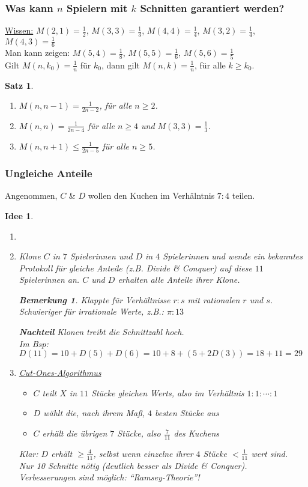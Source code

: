 \documentclass[a4paper,10pt]{scrartcl}
\newtheorem*{bemerkung*}{Bemerkung}
\newtheorem*{satz*}{Satz}
\newtheorem*{idee}{Idee}
\begin{document}
\subsubsection{Was kann $n$ Spielern mit $k$ Schnitten garantiert werden?}
\underline{Wissen:} $M(2,1)=\frac{1}{2}$, $M(3,3)=\frac{1}{3}$, $M(4,4)=\frac{1}{4}$, $M(3,2)=\frac{1}{4}$, $M(4,3)=\frac{1}{6}$\\
Man kann zeigen: $M(5,4)=\frac{1}{8}$, $M(5,5)=\frac{1}{6}$, $M(5,6)=\frac{1}{5}$\\
Gilt $M(n,k_0)=\frac{1}{n}$ für $k_0$, dann gilt $M(n,k)=\frac{1}{n}$, für alle $k\geq k_0$.
\begin{satz*}\item[]
 \begin{enumerate}
  \item $M(n,n-1)=\frac{1}{2n-2}$, für alle $n\geq2$.
  \item $M(n,n)=\frac{1}{2n-4}$ für alle $n\geq4$ und $M(3,3)=\frac{1}{3}$.
  \item $M(n,n+1)\leq\frac{1}{2n-5}$ für alle $n\geq5$.
 \end{enumerate}
\end{satz*}

\subsubsection{Ungleiche Anteile}
Angenommen, $C$ \& $D$ wollen den Kuchen im Verhälntnis $7:4$ teilen.
\begin{idee}
 \begin{enumerate}\item[]
  \item Klone $C$ in $7$ Spielerinnen und $D$ in $4$ Spielerinnen und wende ein bekanntes Protokoll für gleiche Anteile (z.B. Divide \&
        Conquer) auf diese $11$ Spielerinnen an. $C$ und $D$ erhalten alle Anteile ihrer Klone.
        \begin{bemerkung*}
         Klappte für Verhältnisse $r:s$ mit rationalen $r$ und $s$. Schwieriger für irrationale Werte, z.B.: $\pi:13$
        \end{bemerkung*}
        \textbf{Nachteil} Klonen treibt die Schnittzahl hoch.\\
        Im Bsp: $D(11)=10+D(5)+D(6)=10+8+(5+2D(3))=18+11=29$
  \item \underline{Cut-Ones-Algorithmus}
        \begin{itemize}
         \item $C$ teilt $X$ in $11$ Stücke gleichen Werts, also im Verhältnis $1:1:\cdots:1$
         \item $D$ wählt die, nach ihrem Maß, $4$ besten Stücke aus
         \item $C$ erhält die übrigen $7$ Stücke, also $\frac{7}{11}$ des Kuchens
        \end{itemize}
        Klar: $D$ erhält $\geq\frac{4}{11}$, selbst wenn einzelne ihrer $4$ Stücke $<\frac{1}{11}$ wert sind.\\
        Nur 10 Schnitte nötig (deutlich besser als Divide \& Conquer).\\
        Verbesserungen sind möglich: ``Ramsey-Theorie''!
 \end{enumerate}
\end{idee}
\end{document}
